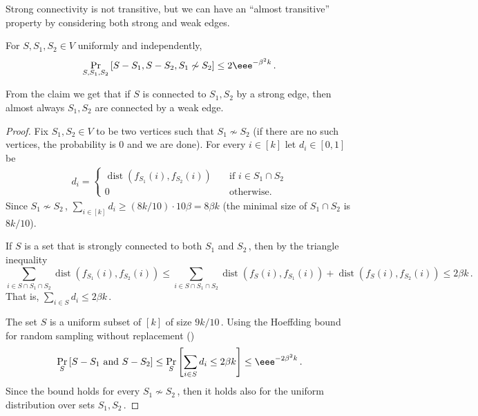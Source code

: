 \documentclass{toc}
\newcommand{\Prob}[2][]{\Pr_{{#1}}\left[#2\right]} %
\newcommand\f{f} %
\DeclareMathOperator{\dist}{dist} %
\newcommand\wconn{\sim} %
\newcommand\sconn{-} %
\begin{document}
Strong connectivity is not transitive, but we can have an ``almost transitive'' property by considering both strong and weak edges.
\begin{claim} \label{claim:no triangle}
	For $S,S_1,S_2\in V$ uniformly and independently,
	\[\Prob[S,S_1,S_2]{S\sconn S_1,S\sconn S_2,S_1\not\wconn S_2} \leq 2\eee^{-\beta^2 k}\,.\]%
\end{claim}
From the claim we get that if $S$ is connected to $S_1,S_2$ by a strong edge, then almost always $S_1,S_2$ are connected by a weak edge.
\begin{proof}
	Fix $S_1,S_2\in V$ to be two vertices such that $S_1\not\wconn S_2$ (if there are no such vertices, the probability is $0$ and we are done).
    For every $i\in[k]$ let $d_i\in[0,1]$ be
    \begin{align*}
    d_i = 
    \begin{cases}
    \dist(\f_{S_1}(i),\f_{S_2}(i)) \quad &\textrm{if }i\in S_1\cap S_2\\
    0  \quad &\textrm{otherwise.}
    \end{cases}
    \end{align*}
    Since $S_1\not\wconn S_2$\,, $\sum_{i\in [k]}d_i \geq 
    (8k/10) %
    \cdot 10\beta = 8\beta k $ (the minimal size of $S_1\cap S_2$ is 
    $8k/10$). %
    
    If $S$ is a set that is strongly connected to both $S_1$ and $S_2$\,, then by the triangle inequality
    \[ \sum_{i\in S\cap S_1 \cap S_2} \dist(\f_{S_1}(i),\f_{S_2}(i)) \leq \sum_{i\in S\cap S_1 \cap S_2}\dist(\f_{S}(i),\f_{S_1}(i))+\dist(\f_{S}(i),\f_{S_2}(i))\leq 2\beta k\,. \]%
    That is, $\sum_{i\in S}d_i\leq 2\beta k$\,.

    The set $S$ is a uniform subset of $[k]$ of size $9k/10$\,. Using
%
the Hoeffding   %
bound for random
%
 sampling without replacement ()  %
\[  \Prob[S]{S\sconn S_1 \textrm{ and  } S\sconn S_2}\leq\Prob[S]{\sum_{i\in S}d_i \leq 2\beta k}\leq  \eee^{-2\beta^2 k}\,.\]%
	Since the bound holds for every $S_1\not\wconn S_2$\,, then it holds also for the uniform distribution over sets $S_1,S_2$\,.
\end{proof}
\end{document}
